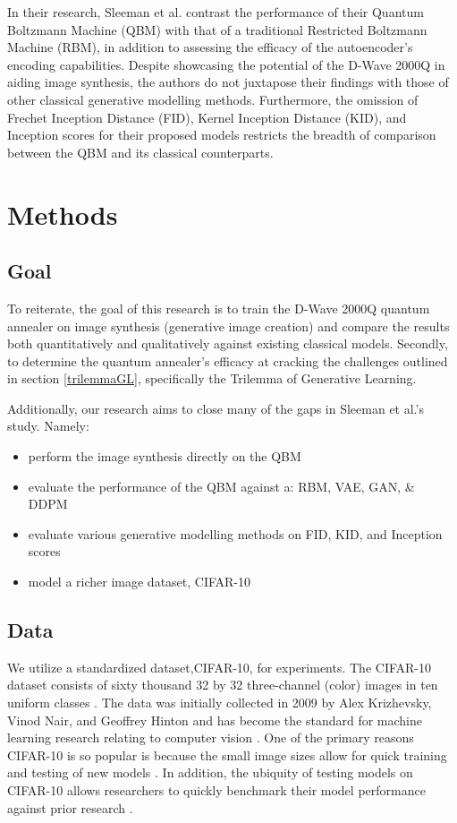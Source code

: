 \documentclass[%
 reprint,
 amsmath,amssymb,
 aps,
]{revtex4-2}
\begin{document}
In their research, Sleeman et al. contrast the performance of their Quantum Boltzmann Machine (QBM) with that of a traditional Restricted Boltzmann Machine (RBM), in addition to assessing the efficacy of the autoencoder's encoding capabilities. Despite showcasing the potential of the D-Wave 2000Q in aiding image synthesis, the authors do not juxtapose their findings with those of other classical generative modelling methods. Furthermore, the omission of Frechet Inception Distance (FID), Kernel Inception Distance (KID), and Inception scores for their proposed models restricts the breadth of comparison between the QBM and its classical counterparts.

\section{Methods}
\subsection{Goal}
To reiterate, the goal of this research is to train the D-Wave 2000Q quantum annealer on image synthesis (generative image creation) and compare the results both quantitatively and qualitatively against existing classical models. Secondly, to determine the quantum annealer's efficacy at cracking the challenges outlined in section \ref{trilemmaGL}, specifically the Trilemma of Generative Learning. 



Additionally, our research aims to close many of the gaps in Sleeman et al.'s study. Namely:

\begin{itemize}
    \item perform the image synthesis directly on the QBM
    \item evaluate the performance of the QBM against a: RBM, VAE, GAN, \& DDPM
    \item evaluate various generative modelling methods on FID, KID, and Inception scores
    \item model a richer image dataset, CIFAR-10
\end{itemize}

\subsection{Data}
We utilize a standardized dataset,CIFAR-10, for experiments. The CIFAR-10 dataset consists of sixty thousand 32 by 32 three-channel (color) images in ten uniform classes \cite{CIFAR}. The data was initially collected in 2009 by Alex Krizhevsky, Vinod Nair, and Geoffrey Hinton and has become the standard for machine learning research relating to computer vision \cite{Krizhevsky09learningmultiple}. One of the primary reasons CIFAR-10 is so popular is because the small image sizes allow for quick training and testing of new models \cite{ai_progress_measurement}. In addition, the ubiquity of testing models on CIFAR-10 allows researchers to quickly benchmark their model performance against prior research \cite{ai_progress_measurement}.
\end{document}
